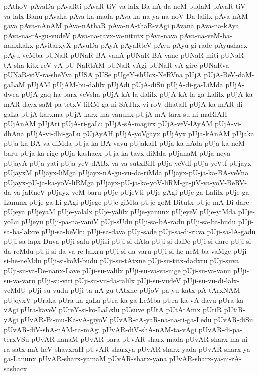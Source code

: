 {pAthoV
pAvaDa
pAvaRti
pAvaR-tiV-va-lalx-Ba-nA-da-neM-budaM
pAvaR-tiV-va-lalx-Banu
pAvaka
pAva-ka-mada
pAva-ka-na-ya-na-noV-Da-lalilx
pAva-nAM-gava
pAva-nAnAM
pAva-nAthaR
pAva-nA-thaR-vAgi
pAvana
pAva-na-kAya
pAva-na-rA-gu-vudeV
pAva-na-tavx-va-nitutx
pAva-nava
pAva-na-veM-ba-nanxkakx
pAvitarxyX
pAvuDa
pAyA
pAyaRteV
pAyu
pAyu-gi-rade
pAyushacx
pAyu-veMba
pUNaR
pUNaR-BA-vanA
pUNaR-BA-vane
pUNaR-miti
pUNaR-tA-sha-kitx-reV-vA-pU-NaRtAM
pUNaR-vAgi
pUNaR-vA-gire
pUNaRva
pUNaR-viV-ra-sheYva
pUSA
pUSe
pUgeY-shUcx-NeRVna
pUjA
pUjA-BeV-daM-gaLaM
pUjAM
pUjAM-bu-dalilx
pUjAdi
pUjA-diSu
pUjA-di-ga-LiMda
pUjA-dwca
pUjA-gaq-ha-parx-veVsha
pUjA-kA-la-dalilx
pUjA-kA-la-ga-Lalilx
pUjA-ka-mAR-dayx-saM-pa-tetxV-liRM-ga-ni-SAThx-vi-roV-dhataH
pUjA-ka-mAR-di-gaLa
pUjA-karxma
pUjA-karx-ma-vanunx
pUjA-mA-tarx-su-ni-maRlAH
pUjAnAM
pUjAri
pUjA-ri-gaLu
pUjA-sA-magirx
pUjA-veV-lAyAM
pUjA-vi-dhAna
pUjA-vi-dhi-gaLu
pUjAyAH
pUjA-yoVgayx
pUjAyx
pUja-kAnAM
pUjaka
pUja-ka-BA-va-diMda
pUja-ka-BA-vavu
pUjakaH
pUja-ka-nAda
pUja-ka-neM-baru
pUja-ka-rige
pUja-kashacx
pUja-ka-tavx-diMda
pUjanaM
pUja-neya
pUjayA
pUja-yati
pUja-yeV-dABx-va-va-sutxBiH
pUja-yeVdf
pUja-yeVtf
pUjayx
pUjayxM
pUjayx-liMga
pUjayx-nA-gu-vu-da-riMda
pUjayx-pU-ja-ka-BA-veVna
pUjayx-pU-ja-ka-yoV-liRMga
pUjayx-pU-ja-ka-yoV-liRM-ga-jiV-va-yoV-BeRV-da-va-jaRneV
pUjayx-veM-baru
pUje
pUjeVti
pUje-gAgi
pUje-ga-Lalilx
pUje-ga-Lanunx
pUje-ga-Li-gAgi
pUjege
pUje-giMta
pUje-goM-Ditutx
pUje-mA-Di-dare
pUjeya
pUjeyaM
pUje-yalalx
pUje-yalilx
pUje-yanunx
pUjeyeV
pUje-yiMda
pUje-yoLu
pUjeyu
pUji-pa-na-vaniV
pUji-sUdu
pUji-sa-bA-radu
pUji-sa-ba-hudu
pUji-sa-ba-lalxre
pUji-sa-beVku
pUji-sa-dava
pUji-sade
pUji-sa-di-ruva
pUji-sa-lA-gadu
pUji-sa-lapx-Duva
pUji-salu
pUjisi
pUji-si-dAta
pUji-si-daDe
pUji-si-dare
pUji-si-da-reMdu
pUji-si-da-va-re-lalxru
pUji-si-da-varu
pUji-si-he-neM-ba-vaMge
pUji-si-he-neMdu
pUji-si-koM-budu
pUji-su-tAtxne
pUji-su-titx-dadxru
pUji-suva
pUji-su-va-De-nanx-Lave
pUji-su-valilx
pUji-su-va-va-nige
pUji-su-va-vanu
pUji-su-va-varu
pUji-su-viri
pUji-su-vu-da-ralilx
pUji-su-vudeV
pUji-su-vu-di-lalx-veMdU
pUji-su-vudu
pUji-ta-nA-gu-tAtxne
pUjoV-pa-yu-katx-pA-tArxNAM
pUjoyxV
pUraka
pUra-ka-gaLa
pUra-ka-ga-LeMba
pUra-ka-vA-davu
pUra-ka-vAgi
pUra-kaveV
pUreY-si-ko-LaLxlu
pUsuve
pUtA
pUtAtAmx
pUtiR
pUtiR-yAgi
pUvAR-Bi-mu-Ka-vA-giyoV
pUvAR-cA-yaR-na-na-ti-ga-Ledu
pUvAR-diSu
pUvAR-diV-shA-nAM-ta-mAgi
pUvAR-diV-shA-nAM-ta-vAgi
pUvAR-di-pa-terxVSu
pUvAR-nanaM
pUvAR-para
pUvAR-sharx-mada
pUvAR-sharx-ma-ni-ra-satx-mA-heV-shavxraH
pUvAR-sharxya
pUvAR-sharx-yada
pUvAR-sharx-ya-ga-Lanunx
pUvAR-sharx-yamaM
pUvAR-sharx-yana
pUvAR-sharx-ya-ni-rA-sashacx
}
